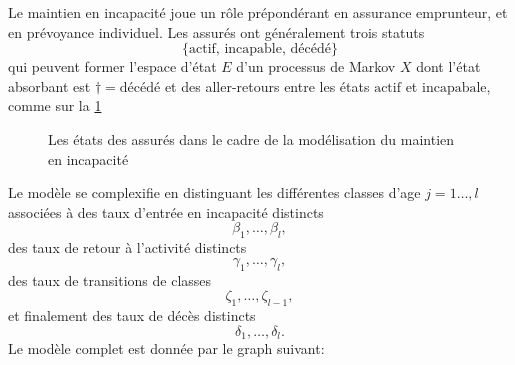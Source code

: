 \begin{ex}
Le maintien en incapacité joue un rôle prépondérant en assurance emprunteur, et en prévoyance individuel. Les assurés ont généralement trois statuts
$$
\{\text{actif, incapable, décédé}\}
$$
qui peuvent former l'espace d'état $E$ d'un processus de Markov $X$ dont l'état absorbant est $\dagger = \text{décédé}$ et des aller-retours entre les états $\text{actif}$ et $\text{incapabale}$, comme sur la \cref{fig:transition_graph_disability}
\begin{figure}[!h]
 \begin{center}
\end{center}
\caption{Les états des assurés dans le cadre de la modélisation du maintien en incapacité}
\label{fig:transition_graph_disability}
\end{figure}
Le modèle  se complexifie en distinguant les différentes classes d'age $j=1\ldots, l$ associées à des taux d'entrée en incapacité distincts
$$
\beta_1,\ldots, \beta_l,
$$
des taux de retour à l'activité distincts
$$
\gamma_1,\ldots, \gamma_l,
$$
des taux de transitions de classes 
$$
\zeta_1,\ldots, \zeta_{l-1},
$$
et finalement des taux de décès distincts
$$
\delta_1,\ldots, \delta_l.
$$
Le modèle complet est donnée par le graph suivant:
\begin{figure}[ht!]
\begin{center}
\end{center}
\end{figure}
\end{ex}

